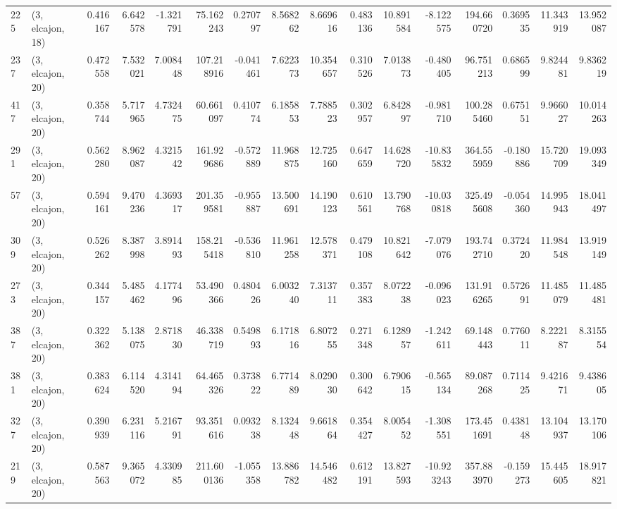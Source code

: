 \begin{tabular}{llrrrrrrrrrrrrrr}
225 &  (3, elcajon, 18) &   0.416167 &   6.642578 &  -1.321791 &    75.162243 &   0.270797 &   8.568262 &   8.669616 &  0.483136 &  10.891584 &  -8.122575 &   194.660720 &   0.369535 &  11.343919 &  13.952087 \\
237 &  (3, elcajon, 20) &   0.472558 &   7.532021 &   7.008448 &   107.218916 &  -0.041461 &   7.622373 &  10.354657 &  0.310526 &   7.013873 &  -0.480405 &    96.751213 &   0.686599 &   9.824481 &   9.836219 \\
417 &  (3, elcajon, 20) &   0.358744 &   5.717965 &   4.732475 &    60.661097 &   0.410774 &   6.185853 &   7.788523 &  0.302957 &   6.842897 &  -0.981710 &   100.285460 &   0.675151 &   9.966027 &  10.014263 \\
291 &  (3, elcajon, 20) &   0.562280 &   8.962087 &   4.321542 &   161.929686 &  -0.572889 &  11.968875 &  12.725160 &  0.647659 &  14.628720 & -10.835832 &   364.555959 &  -0.180886 &  15.720709 &  19.093349 \\
57  &  (3, elcajon, 20) &   0.594161 &   9.470236 &   4.369317 &   201.359581 &  -0.955887 &  13.500691 &  14.190123 &  0.610561 &  13.790768 & -10.030818 &   325.495608 &  -0.054360 &  14.995943 &  18.041497 \\
309 &  (3, elcajon, 20) &   0.526262 &   8.387998 &   3.891493 &   158.215418 &  -0.536810 &  11.961258 &  12.578371 &  0.479108 &  10.821642 &  -7.079076 &   193.742710 &   0.372420 &  11.984548 &  13.919149 \\
273 &  (3, elcajon, 20) &   0.344157 &   5.485462 &   4.177496 &    53.490366 &   0.480426 &   6.003240 &   7.313711 &  0.357383 &   8.072238 &  -0.096023 &   131.916265 &   0.572691 &  11.485079 &  11.485481 \\
387 &  (3, elcajon, 20) &   0.322362 &   5.138075 &   2.871830 &    46.338719 &   0.549893 &   6.171816 &   6.807255 &  0.271348 &   6.128957 &  -1.242611 &    69.148443 &   0.776011 &   8.222187 &   8.315554 \\
381 &  (3, elcajon, 20) &   0.383624 &   6.114520 &   4.314194 &    64.465326 &   0.373822 &   6.771489 &   8.029030 &  0.300642 &   6.790615 &  -0.565134 &    89.087268 &   0.711425 &   9.421671 &   9.438605 \\
327 &  (3, elcajon, 20) &   0.390939 &   6.231116 &   5.216791 &    93.351616 &   0.093238 &   8.132448 &   9.661864 &  0.354427 &   8.005452 &  -1.308551 &   173.451691 &   0.438148 &  13.104937 &  13.170106 \\
219 &  (3, elcajon, 20) &   0.587563 &   9.365072 &   4.330985 &   211.600136 &  -1.055358 &  13.886782 &  14.546482 &  0.612191 &  13.827593 & -10.923243 &   357.883970 &  -0.159273 &  15.445605 &  18.917821 \\

\end{tabular}
